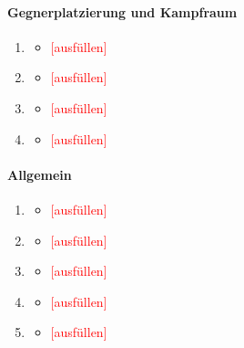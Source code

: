 \documentclass[../Main.tex]{subfiles}
\begin{document}
\paragraph{Gegnerplatzierung und Kampfraum}
\begin{enumerate}[label=\textbf{B\arabic*}, leftmargin=1.5cm, itemsep=0.8em, resume]
    \item
        \begin{itemize}[nosep]
            \item \textcolor{red}{[ausfüllen]}
        \end{itemize}
    \item
        \begin{itemize}[nosep]
            \item \textcolor{red}{[ausfüllen]}
        \end{itemize}
    \item
        \begin{itemize}[nosep]
            \item \textcolor{red}{[ausfüllen]}
        \end{itemize}
    \item
        \begin{itemize}[nosep]
            \item \textcolor{red}{[ausfüllen]}
        \end{itemize}
\end{enumerate}

\paragraph{Allgemein}
\begin{enumerate}[label=\textbf{B\arabic*}, leftmargin=1.5cm, itemsep=0.8em, resume]
    \item
        \begin{itemize}[nosep]
            \item \textcolor{red}{[ausfüllen]}
        \end{itemize}
    \item
        \begin{itemize}[nosep]
            \item \textcolor{red}{[ausfüllen]}
        \end{itemize}
    \item
        \begin{itemize}[nosep]
            \item \textcolor{red}{[ausfüllen]}
        \end{itemize}
    \item
        \begin{itemize}[nosep]
            \item \textcolor{red}{[ausfüllen]}
        \end{itemize}
    \item
        \begin{itemize}[nosep]
            \item \textcolor{red}{[ausfüllen]}
        \end{itemize}
\end{enumerate}
\end{document}
